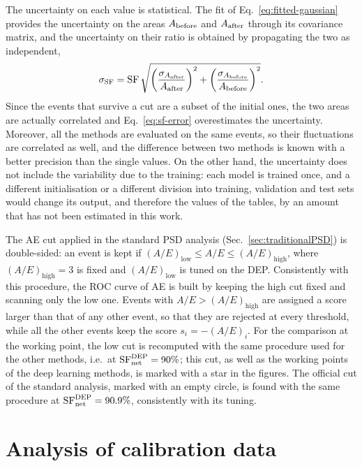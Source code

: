 The uncertainty on each value is statistical. The fit of Eq.~\ref{eq:fitted-gaussian} provides the uncertainty on the areas $A_{\rm before}$ and $A_{\rm after}$ through its covariance matrix, and the uncertainty on their ratio is obtained by propagating the two as independent,
\begin{equation}
    \sigma_{\rm SF} = \mathrm{SF}\,\sqrt{\left(\frac{\sigma_{A_{\rm after}}}{A_{\rm after}}\right)^2 + \left(\frac{\sigma_{A_{\rm before}}}{A_{\rm before}}\right)^2}.
    \label{eq:sf-error}
\end{equation}
Since the events that survive a cut are a subset of the initial ones, the two areas are actually correlated and Eq.~\ref{eq:sf-error} overestimates the uncertainty. Moreover, all the methods are evaluated on the same events, so their fluctuations are correlated as well, and the difference between two methods is known with a better precision than the single values. On the other hand, the uncertainty does not include the variability due to the training: each model is trained once, and a different initialisation or a different division into training, validation and test sets would change its output, and therefore the values of the tables, by an amount that has not been estimated in this work.

The \ac{AE} cut applied in the standard \ac{PSD} analysis (Sec.~\ref{sec:traditionalPSD}) is double-sided: an event is kept if $(A/E)_{\mathrm{low}} \leq A/E \leq (A/E)_{\mathrm{high}}$, where $(A/E)_{\mathrm{high}} = 3$ is fixed and $(A/E)_{\mathrm{low}}$ is tuned on the \ac{DEP}. Consistently with this procedure, the \ac{ROC} curve of \ac{AE} is built by keeping the high cut fixed and scanning only the low one. Events with $A/E > (A/E)_{\mathrm{high}}$ are assigned a score larger than that of any other event, so that they are rejected at every threshold, while all the other events keep the score $s_i = -(A/E)_i$. For the comparison at the working point, the low cut is recomputed with the same procedure used for the other methods, i.e.\ at $\mathrm{SF}^{\rm DEP}_{\rm net} = 90\%$; this cut, as well as the working points of the deep learning methods, is marked with a star in the figures. The official cut of the standard analysis, marked with an empty circle, is found with the same procedure at $\mathrm{SF}^{\rm DEP}_{\rm net} = 90.9\%$, consistently with its tuning.

\section{Analysis of calibration data}
\label{sec:calib-data}

